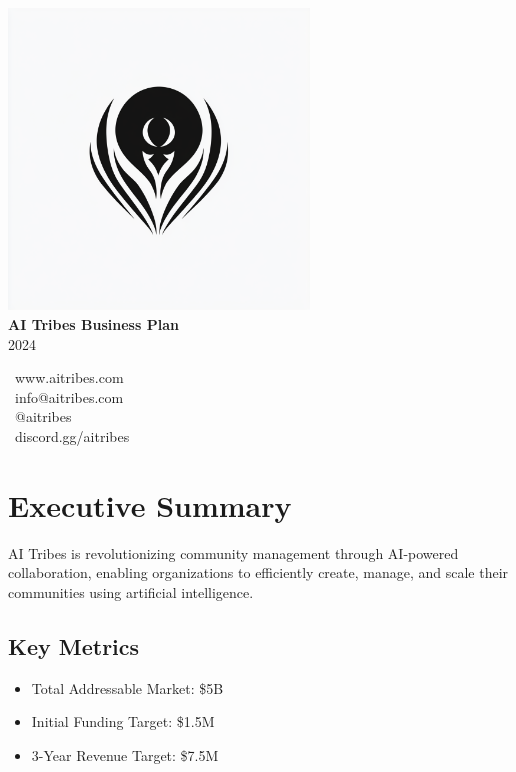 \documentclass[11pt]{article}
\begin{document}
\begin{titlepage}
    \centering
    \vspace*{2cm}
    \includegraphics[width=0.6\textwidth]{tribes_logo.png}\\[2cm]
    {\Huge\bfseries AI Tribes Business Plan\\[0.5cm]}
    {\large\textcolor{secondary}{2024}}\\[2cm]
    
    \begin{abstract}
    Revolutionizing community management through AI-powered collaboration
    \end{abstract}
    
    \vfill
    
    {\large\textcolor{secondary}{
    \faGlobe\ www.aitribes.com\\
    \faEnvelope\ info@aitribes.com\\
    \faTwitter\ @aitribes\\
    \faDiscord\ discord.gg/aitribes
    }}
\end{titlepage}

\tableofcontents
\newpage

\section{Executive Summary}
AI Tribes is revolutionizing community management through AI-powered collaboration, enabling organizations to efficiently create, manage, and scale their communities using artificial intelligence.

\subsection{Key Metrics}
\begin{itemize}
    \item Total Addressable Market: \$5B
    \item Initial Funding Target: \$1.5M
    \item 3-Year Revenue Target: \$7.5M
\end{itemize}
\end{document}

